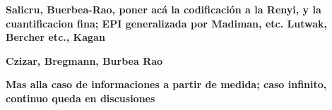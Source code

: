 
\label{sec:SZ:Salicru}

{\bf  Salicru, Buerbea-Rao,  poner  ac\'a la  codificaci\'on  a la  Renyi, y  la
  cuantificacion fina; EPI generalizada  por Madiman, etc. Lutwak, Bercher etc.,
  Kagan}


\label{sec:SZ:Czizar}

{\bf Czizar, Bregmann, Burbea Rao}



\label{sec:SZ:Cuanticas}

{\bf Mas alla caso de informaciones a partir de medida; caso infinito, continuo queda en discusiones}







